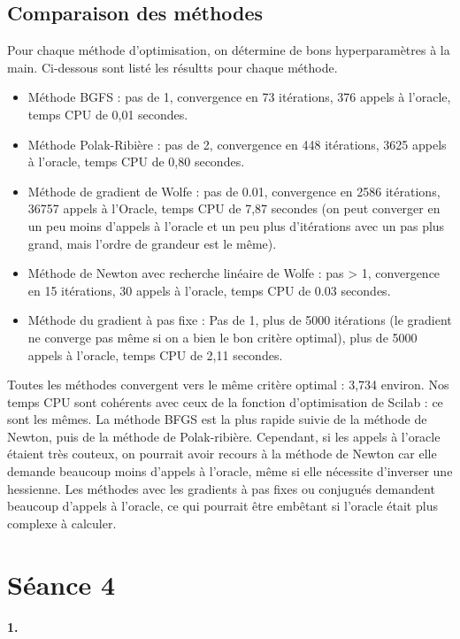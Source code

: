 \documentclass[11pt]{article}
\begin{document}
\subsection*{Comparaison des méthodes}
Pour chaque méthode d'optimisation, on détermine de bons hyperparamètres à la main. Ci-dessous sont listé les résultts pour chaque méthode.
\begin{itemize}
\item Méthode BGFS : pas de 1, convergence en 73 itérations, 376 appels à l'oracle, temps CPU de 0,01 secondes.
\item Méthode Polak-Ribière : pas de 2, convergence en 448 itérations, 3625 appels à l'oracle, temps CPU de 0,80 secondes.
\item Méthode de gradient de Wolfe : pas de 0.01, convergence en 2586 itérations, 36757 appels à l'Oracle, temps CPU de 7,87 secondes (on peut converger en un peu moins d'appels à l'oracle et un peu plus d'itérations avec un pas plus grand, mais l'ordre de grandeur est le même).
\item Méthode de Newton avec recherche linéaire de Wolfe : pas > 1, convergence en 15 itérations, 30 appels à l'oracle, temps CPU de 0.03 secondes.
\item Méthode du gradient à pas fixe : Pas de 1, plus de 5000 itérations (le gradient ne converge pas même si on a bien le bon critère optimal), plus de 5000 appels à l'oracle, temps CPU de 2,11 secondes.
\end{itemize}

Toutes les méthodes convergent vers le même critère optimal : 3,734 environ.
Nos temps CPU sont cohérents avec ceux de la fonction d'optimisation de Scilab : ce sont les mêmes.
La méthode BFGS est la plus rapide suivie de la méthode de Newton, puis de la méthode de Polak-ribière. Cependant, si les appels à l'oracle étaient très couteux, on pourrait avoir recours à la méthode de Newton car elle demande beaucoup moins d'appels à l'oracle, même si elle nécessite d'inverser une hessienne.
Les méthodes avec les gradients à pas fixes ou conjugués demandent beaucoup d'appels à l'oracle, ce qui pourrait être embêtant si l'oracle était plus complexe à calculer.


\section*{Séance 4}

\paragraph{1.} ~\\
\end{document}
